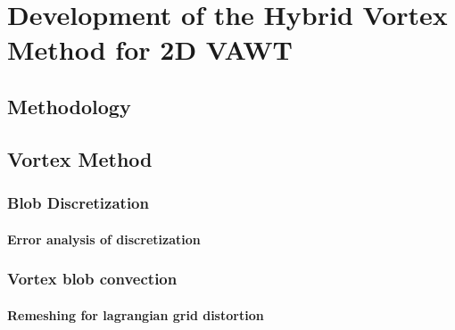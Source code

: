 \chapter{Development of the Hybrid Vortex Method for 2D VAWT}


\section{Methodology}

\section{Vortex Method}



\subsection{Blob Discretization}

\subsubsection{Error analysis of discretization}

\subsection{Vortex blob convection}

\subsubsection{Remeshing for lagrangian grid distortion}

